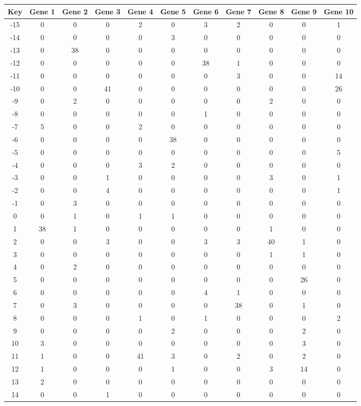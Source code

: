 \begin{tabular}{|c|c|c|c|c|c|c|c|c|c|c|}
\hline
Key & Gene 1 & Gene 2 & Gene 3 & Gene 4 & Gene 5 & Gene 6 & Gene 7 & Gene 8 & Gene 9 & Gene 10 \\
\hline
-15 & 0 & 0 & 0 & 2 & 0 & 3 & 2 & 0 & 0 & 1 \\
-14 & 0 & 0 & 0 & 0 & 3 & 0 & 0 & 0 & 0 & 0 \\
-13 & 0 & 38 & 0 & 0 & 0 & 0 & 0 & 0 & 0 & 0 \\
-12 & 0 & 0 & 0 & 0 & 0 & 38 & 1 & 0 & 0 & 0 \\
-11 & 0 & 0 & 0 & 0 & 0 & 0 & 3 & 0 & 0 & 14 \\
-10 & 0 & 0 & 41 & 0 & 0 & 0 & 0 & 0 & 0 & 26 \\
-9 & 0 & 2 & 0 & 0 & 0 & 0 & 0 & 2 & 0 & 0 \\
-8 & 0 & 0 & 0 & 0 & 0 & 1 & 0 & 0 & 0 & 0 \\
-7 & 5 & 0 & 0 & 2 & 0 & 0 & 0 & 0 & 0 & 0 \\
-6 & 0 & 0 & 0 & 0 & 38 & 0 & 0 & 0 & 0 & 0 \\
-5 & 0 & 0 & 0 & 0 & 0 & 0 & 0 & 0 & 0 & 5 \\
-4 & 0 & 0 & 0 & 3 & 2 & 0 & 0 & 0 & 0 & 0 \\
-3 & 0 & 0 & 1 & 0 & 0 & 0 & 0 & 3 & 0 & 1 \\
-2 & 0 & 0 & 4 & 0 & 0 & 0 & 0 & 0 & 0 & 1 \\
-1 & 0 & 3 & 0 & 0 & 0 & 0 & 0 & 0 & 0 & 0 \\
0 & 0 & 1 & 0 & 1 & 1 & 0 & 0 & 0 & 0 & 0 \\
1 & 38 & 1 & 0 & 0 & 0 & 0 & 0 & 1 & 0 & 0 \\
2 & 0 & 0 & 3 & 0 & 0 & 3 & 3 & 40 & 1 & 0 \\
3 & 0 & 0 & 0 & 0 & 0 & 0 & 0 & 1 & 1 & 0 \\
4 & 0 & 2 & 0 & 0 & 0 & 0 & 0 & 0 & 0 & 0 \\
5 & 0 & 0 & 0 & 0 & 0 & 0 & 0 & 0 & 26 & 0 \\
6 & 0 & 0 & 0 & 0 & 0 & 4 & 1 & 0 & 0 & 0 \\
7 & 0 & 3 & 0 & 0 & 0 & 0 & 38 & 0 & 1 & 0 \\
8 & 0 & 0 & 0 & 1 & 0 & 1 & 0 & 0 & 0 & 2 \\
9 & 0 & 0 & 0 & 0 & 2 & 0 & 0 & 0 & 2 & 0 \\
10 & 3 & 0 & 0 & 0 & 0 & 0 & 0 & 0 & 3 & 0 \\
11 & 1 & 0 & 0 & 41 & 3 & 0 & 2 & 0 & 2 & 0 \\
12 & 1 & 0 & 0 & 0 & 1 & 0 & 0 & 3 & 14 & 0 \\
13 & 2 & 0 & 0 & 0 & 0 & 0 & 0 & 0 & 0 & 0 \\
14 & 0 & 0 & 1 & 0 & 0 & 0 & 0 & 0 & 0 & 0 \\
\hline
\end{tabular}